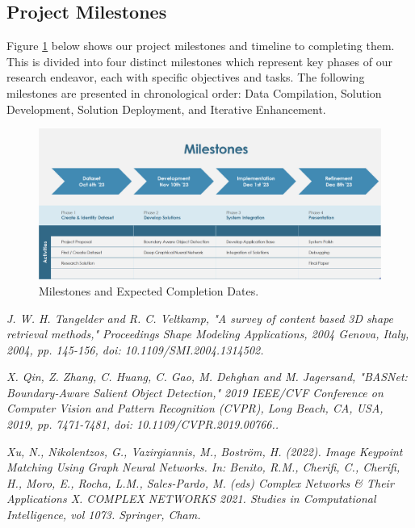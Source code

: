 \documentclass[letter,10pt]{article}
\begin{document}
\begin{multicols}{2}
		
  
        \section{Project Milestones}
		Figure \ref{fig:milestones} below shows our project milestones and timeline to completing them. This is divided into four distinct milestones which represent key phases of our research endeavor, each with specific objectives and tasks. The following milestones are presented in chronological order: Data Compilation, Solution Development, Solution Deployment, and Iterative Enhancement.
        \par

    \begin{figure}[t!]
        \centering
        \includegraphics[width=\textwidth]{images/ProjectMilestones.png}
        \caption{Milestones and Expected Completion Dates.}
        \label{fig:milestones}
    \end{figure}

		\begin{thebibliography}{3}
			\textit{J. W. H. Tangelder and R. C. Veltkamp, "A survey of content based 3D shape retrieval methods," Proceedings Shape Modeling Applications, 2004 Genova, Italy, 2004, pp. 145-156, doi: 10.1109/SMI.2004.1314502.}

			\textit{X. Qin, Z. Zhang, C. Huang, C. Gao, M. Dehghan and M. Jagersand, "BASNet: Boundary-Aware Salient Object Detection," 2019 IEEE/CVF Conference on     Computer Vision and Pattern Recognition (CVPR), Long Beach, CA, USA, 2019, pp. 7471-7481, doi: 10.1109/CVPR.2019.00766..}

                \textit{Xu, N., Nikolentzos, G., Vazirgiannis, M., Boström, H. (2022). Image Keypoint Matching Using Graph Neural Networks. In: Benito, R.M., Cherifi, C., Cherifi, H., Moro, E., Rocha, L.M., Sales-Pardo, M. (eds) Complex Networks & Their Applications X. COMPLEX NETWORKS 2021. Studies in Computational Intelligence, vol 1073. Springer, Cham.}

		\end{thebibliography}
	\end{multicols}
\end{document}
